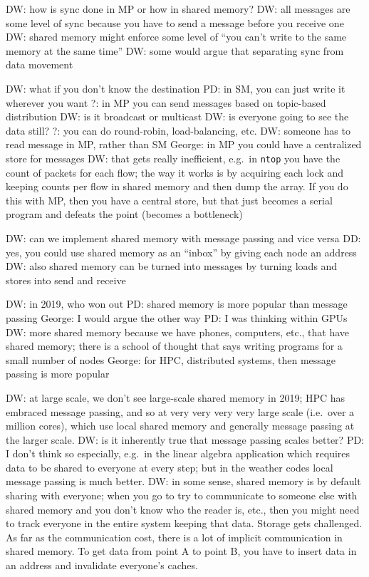 DW: how is sync done in MP or how in shared memory?
DW: all messages are some level of sync because you have to send a message before you receive one
DW: shared memory might enforce some level of ``you can't write to the same memory at the same time''
DW: some would argue that separating sync from data movement

DW: what if you don't know the destination
PD: in SM, you can just write it wherever you want
?: in MP you can send messages based on topic-based distribution
DW: is it broadcast or multicast
DW: is everyone going to see the data still?
?: you can do round-robin, load-balancing, etc.
DW: someone has to read message in MP, rather than SM
George: in MP you could have a centralized store for messages
DW: that gets really inefficient, e.g.\ in \texttt{ntop} you have the count of packets for each flow; the way it works is by acquiring each lock and keeping counts per flow in shared memory and then dump the array.
If you do this with MP, then you have a central store, but that just becomes a serial program and defeats the point (becomes a bottleneck)

DW: can we implement shared memory with message passing and vice versa
DD: yes, you could use shared memory as an ``inbox'' by giving each node an address
DW: also shared memory can be turned into messages by turning loads and stores into send and receive

DW: in 2019, who won out
PD: shared memory is more popular than message passing
George: I would argue the other way
PD: I was thinking within GPUs
DW: more shared memory because we have phones, computers, etc., that have shared memory; there is a school of thought that says writing programs for a small number of nodes
George: for HPC, distributed systems, then message passing is more popular

DW: at large scale, we don't see large-scale shared memory in 2019; HPC has embraced message passing, and so at very very very very large scale (i.e.\ over a million cores), which use local shared memory and generally message passing at the larger scale.
DW: is it inherently true that message passing scales better?
PD: I don't think so especially, e.g.\ in the linear algebra application which requires data to be shared to everyone at every step; but in the weather codes local message passing is much better.
DW: in some sense, shared memory is by default sharing with everyone; when you go to try to communicate to someone else with shared memory and you don't know who the reader is, etc., then you might need to track everyone in the entire system keeping that data. Storage gets challenged.
As far as the communication cost, there is a lot of implicit communication in shared memory.
To get data from point A to point B, you have to insert data in an address and invalidate everyone's caches.

